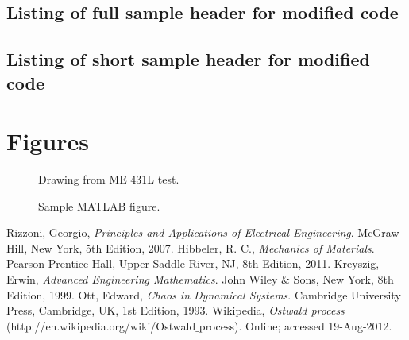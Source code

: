 \documentclass{article}
\begin{document}
\subsection{Listing of full sample header for modified code}

\subsection{Listing of short sample header for modified code}

\pagebreak
\section{Figures \label{FigureList}}

\begin{figure}[htb]
\begin{center}
\caption{Drawing from ME 431L test.}
\end{center}
\end{figure}

\begin{figure}[htb]
\begin{center}
\caption{Sample MATLAB figure.}
\end{center}
\end{figure}
\pagebreak

\begin{thebibliography}{9}
Rizzoni, Georgio,
{\it Principles and Applications of Electrical Engineering}.
McGraw-Hill, New York,
5th Edition,
2007.
Hibbeler, R. C.,
{\it Mechanics of Materials}.
Pearson Prentice Hall, Upper Saddle River, NJ, 8th Edition, 2011.
Kreyszig, Erwin,
{\it Advanced Engineering Mathematics}.
John Wiley \& Sons, New York, 8th Edition, 1999.
Ott, Edward,
{\it Chaos in Dynamical Systems}.
Cambridge University Press, Cambridge, UK, 1st Edition, 1993.
Wikipedia, 
{\it Ostwald process} (http://en.wikipedia.org/wiki/Ostwald$\_$process).
Online; accessed 19-Aug-2012.
\end{thebibliography}
\end{document}
